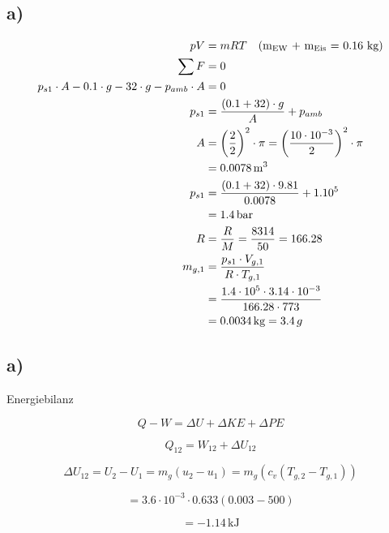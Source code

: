

\subsection*{a)}

\begin{align*}
pV &= mRT \quad \text{(m\textsubscript{EW} + m\textsubscript{Eis} = 0.16 kg)} \\
\sum F &= 0 \\
p_{s1} \cdot A - 0.1 \cdot g - 32 \cdot g - p_{amb} \cdot A &= 0 \\
p_{s1} &= \frac{(0.1 + 32) \cdot g}{A} + p_{amb} \\
A &= \left(\frac{2}{2}\right)^2 \cdot \pi = \left(\frac{10 \cdot 10^{-3}}{2}\right)^2 \cdot \pi \\
&= 0.0078 \, \text{m}^3 \\
p_{s1} &= \frac{(0.1 + 32) \cdot 9.81}{0.0078} + 1.10^5 \\
&= 1.4 \, \text{bar} \\
R &= \frac{R}{M} = \frac{8314}{50} = 166.28 \\
m_{g,1} &= \frac{p_{s1} \cdot V_{g,1}}{R \cdot T_{g,1}} \\
&= \frac{1.4 \cdot 10^5 \cdot 3.14 \cdot 10^{-3}}{166.28 \cdot 773} \\
&= 0.0034 \, \text{kg} = 3.4 \, g
\end{align*}



\subsection*{a)}

Energiebilanz

\[
Q - W = \Delta U + \Delta KE + \Delta PE
\]

\[
Q_{12} = W_{12} + \Delta U_{12}
\]

\[
\Delta U_{12} = U_2 - U_1 = m_g (u_2 - u_1) = m_g \left( c_v (T_{g,2} - T_{g,1}) \right)
\]

\[
= 3.6 \cdot 10^{-3} \cdot 0.633 \left( 0.003 - 500 \right)
\]

\[
= -1.14 \, \text{kJ}
\]